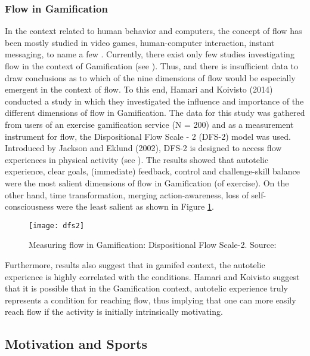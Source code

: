 \subsubsection{Flow in Gamification}
In the context related to human behavior and computers, the concept of flow has been mostly studied in video games, human-computer interaction, instant messaging, to name a few \cite{hamari2014measuring}. Currently, there exist only few studies investigating flow in the context of Gamification (see \cite{hamari2014measuring, sillaots2014achieving}). Thus, and there is insufficient data to draw conclusions as to which of the nine dimensions of flow would be especially emergent in the context of flow. To this end, Hamari and Koivisto (2014) conducted a study in which they investigated the influence and importance of the different dimensions of flow in Gamification.  The data for this study was gathered from users of an exercise gamification service (N = 200) and as a measurement instrument for flow, the Dispositional Flow Scale - 2 (DFS-2) model was used. Introduced by Jackson and Eklund (2002), DFS-2 is designed to access flow experiences in physical activity (see \cite{jackson2002assessing}). The results showed that autotelic experience, clear goals, (immediate) feedback, control and challenge-skill balance were the most salient dimensions of flow in Gamification (of exercise). On the other hand, time transformation, merging action-awareness, loss of self-consciousness were the least salient as shown in Figure \ref{fig:dfs2}.
\begin{figure}[h]
    \centering
    \texttt{[image: dfs2]}
    \caption{Measuring flow in Gamification: Dispositional Flow Scale-2. Source:  \cite{dfs2}}
    \label{fig:dfs2}
\end{figure}
Furthermore, results also suggest that in gamifed context, the autotelic experience is highly correlated with the conditions. Hamari and Koivisto suggest that it is possible that in the Gamification context, autotelic experience truly represents a condition for reaching flow, thus implying that one can more easily reach flow if the activity is initially intrinsically motivating. 
\subsection{Motivation and Sports}

